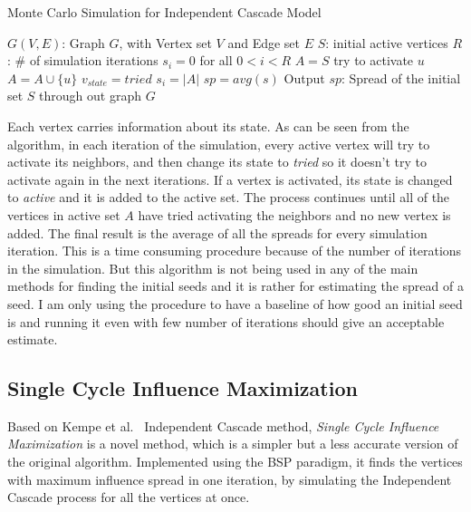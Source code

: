 \documentclass[english]{tktltiki}
\begin{document}
\begin{algorithm}[ht!]
\caption{Monte Carlo Simulation for Independent Cascade Model}
\label{alg:simulation}
\begin{algorithmic}
\Require $G(V,E)$: Graph $G$, with Vertex set $V$ and Edge set $E$
\Require $S$: initial active vertices
\Require $R$: \# of simulation iterations
\State $s_i=0$ for all $0<i<R$
	\State $A=S$ 
				\State try to activate $u$
					\State $A=A\cup \{u\}$
				\EndIf
			\EndFor
			\State $v_{state} = tried$
		\EndIf
	\EndFor
	\State $s_i=|A|$	
\EndFor
\State $sp=avg(s)$
\State Output $sp$: Spread of the initial set $S$ through out graph $G$
\end{algorithmic}
\end{algorithm}
Each vertex carries information about its state. 
As can be seen from the algorithm, in each iteration of the simulation, every active vertex will try to activate its neighbors, and then change its state to \textit{tried} so it doesn't try to activate again in the next iterations. 
If a vertex is activated, its state is changed to \textit{active} and it is added to the active set. 
The process continues until all of the vertices in active set $A$ have tried activating the neighbors and no new vertex is added. 
The final result is the average of all the spreads for every simulation iteration. 
This is a time consuming procedure because of the number of iterations in the simulation. 
But this algorithm is not being used in any of the main methods for finding the initial seeds and it is rather for estimating the spread of a seed. 
I am only using the procedure to have a baseline of how good an initial seed is and running it even with few number of iterations should give an acceptable estimate.

\subsection{Single Cycle Influence Maximization}
Based on Kempe et al.\ \cite{kempe03} Independent Cascade method, \textit{Single Cycle Influence Maximization} is a novel method, which is a simpler but a less accurate version of the original algorithm. 
Implemented using the BSP paradigm, it finds the vertices with maximum influence spread in one iteration, by simulating the Independent Cascade process for all the vertices at once.
\end{document}
